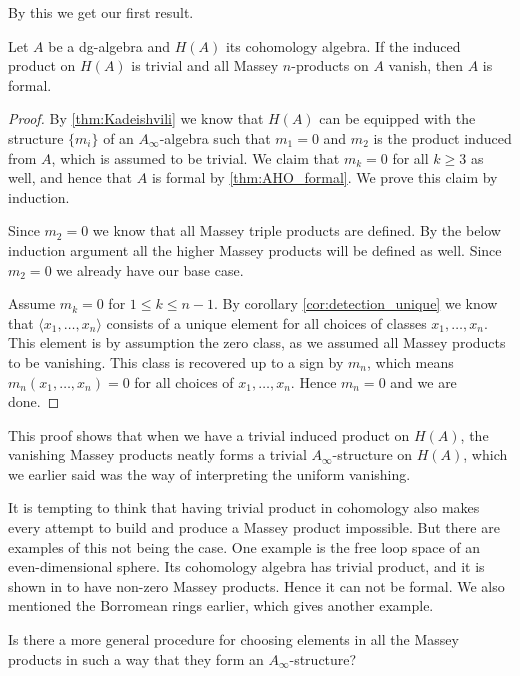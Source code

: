 By this we get our first result.

\begin{theorem}
    \label{thm:1}
    Let $A$ be a dg-algebra and $H(A)$ its cohomology algebra. If the induced product on 
    $H(A)$ is trivial and all Massey $n$-products on $A$ vanish, then $A$ is formal.        
\end{theorem}

\begin{proof}
    By \cref{thm:Kadeishvili} we know that $H(A)$ can be equipped with the structure 
    $\{m_i\}$ of an $A_\infty$-algebra such that $m_1=0$ and $m_2$ is the product induced 
    from $A$, which is assumed to be trivial. We claim that $m_k = 0$ for all $k\geq 3$ 
    as well, and hence that $A$ is formal by \cref{thm:AHO_formal}. We prove this 
    claim by induction. 
    
    Since $m_2=0$ we know that all Massey triple products are defined. By the below 
    induction argument all the higher Massey products will be defined as well. Since 
    $m_2=0$ we already have our base case.
    
    Assume $m_k = 0$ for $1\leq k\leq n-1$. By corollary \ref{cor:detection_unique} we know 
    that $\langle x_1, \ldots, x_n \rangle$ consists of a unique element for all choices of 
    classes $x_1, \ldots, x_n$. This element is by assumption the zero class, as we assumed 
    all Massey products to be vanishing. This class is recovered up to a sign by $m_n$, 
    which means $m_n(x_1,\ldots, x_n)=0$ for all choices of $x_1, \ldots, x_n$. Hence 
    $m_n=0$ and we are done. 
\end{proof}

This proof shows that when we have a trivial induced product on $H(A)$, the vanishing 
Massey products neatly forms a trivial $A_\infty$-structure on $H(A)$, which we earlier 
said was the way of interpreting the uniform vanishing.

It is tempting to think that having trivial product in cohomology also makes every attempt 
to build and produce a Massey product impossible. But there are examples of this not being 
the case. One example is the free loop space of an even-dimensional sphere. Its cohomology 
algebra has trivial product, and it is shown in \cite{nonformal_loop} to have non-zero 
Massey products. Hence it can not be formal. We also mentioned the Borromean rings earlier, 
which gives another example. 

\begin{question}
Is there a more general procedure for choosing elements in all the Massey 
products in such a way that they form an $A_\infty$-structure?
\end{question}